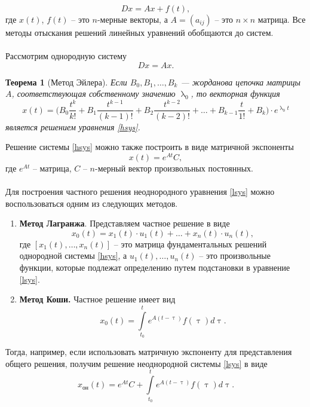 \documentclass[a4paper, 12pt]{report}
\numberwithin{equation}{section}
\renewcommand{\tau}{\uptau}
\renewcommand{\lambda}{\uplambda}
\newtheorem*{theorem}{Теорема}
\begin{document}
	\begin{equation}
		\label{lsys}
		Dx = Ax + f(t),
	\end{equation}
	где $x(t)$, $f(t)$ -- это $n$-мерные векторы, а $A=(a_{ij})$ -- это $n\times n$ матрица. Все методы отыскания решений линейных уравнений обобщаются до систем.
	\\\\
	Рассмотрим однородную систему 
	\begin{equation}
		\label{hsys}
		Dx = Ax.
	\end{equation}
	\begin{theorem}[Метод Эйлера]
		Если $B_0, B_1, \ldots, B_k$ --- жорданова цепочка матрицы $A$, соответствующая собственному значению $\lambda_0$, то векторная функция $$x(t) = \Big(B_0\dfrac{t^k}{k!} + B_1\dfrac{t^{k-1}}{(k-1)!} + B_2\dfrac{t^{k-2}}{(k-2)!} + \ldots + B_{k-1}\dfrac{t}{1!} + B_k\Big)\cdot e^{\lambda_0 t}$$ является решением уравнения \eqref{hsys}. 
	\end{theorem}
	\noindent
	Решение системы \eqref{hsys} можно также построить в виде матричной экспоненты
	\begin{equation}
		x(t) = e^{At}C,
	\end{equation}
	где $e^{At}$ -- матрица, $C$ -- $n$-мерный вектор произвольных постоянных.
	\\\\
	Для построения частного решения неоднородного уравнения \eqref{lsys} можно воспользоваться одним из следующих методов.
	\begin{enumerate}
		\item \textbf{Метод Лагранжа}. Представляем частное решение в виде
		\begin{equation}
			x_0(t) = x_1(t)\cdot u_1(t) + \ldots + x_n(t)\cdot u_n(t),
		\end{equation}
		где $[x_1(t),\ldots, x_n(t)]$ -- это матрица фундаментальных решений однородной системы \eqref{hsys}, а $u_1(t),\ldots, u_n(t)$ -- это произвольные функции, которые подлежат определению путем подстановки в уравнение \eqref{lsys}.
		\item \textbf{Метод Коши.} Частное решение имеет вид
		\begin{equation}
			x_0(t) = \int\limits_{t_0}^t e^{A(t-\tau)}f(\tau)d\tau.
		\end{equation}
	\end{enumerate}
	Тогда, например, если использовать матричную экспоненту для представления общего решения, получим решение неоднородной системы \eqref{lsys} в виде
	\begin{equation}
		x_{\text{он}}(t) =e^{At} C + \int\limits_{t_0}^t e^{A(t-\tau)}f(\tau)d\tau.
	\end{equation}
\end{document}
